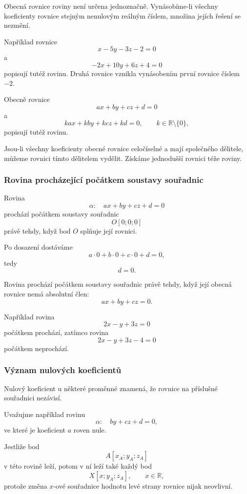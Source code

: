 Obecná rovnice roviny není určena jednoznačně. Vynásobíme-li všechny
koeficienty rovnice stejným nenulovým reálným číslem, množina jejích
řešení se nezmění.

Například rovnice
\[
    x-5y-3z-2=0
\]
a
\[
    -2x+10y+6z+4=0
\]
popisují tutéž rovinu. Druhá rovnice vznikla vynásobením první rovnice
číslem $-2$.

Obecně rovnice
\[
    ax+by+cz+d=0
\]
a
\[
    kax+kby+kcz+kd=0,
    \qquad
    k\in\mathbb{R}\setminus\{0\},
\]
popisují tutéž rovinu.

\begin{remark}
    Jsou-li všechny koeficienty obecné rovnice celočíselné a mají
    společného dělitele, můžeme rovnici tímto dělitelem vydělit.
    Získáme jednodušší rovnici téže roviny.
\end{remark}


\subsubsection{Rovina procházející počátkem soustavy souřadnic}
\label{subsubsec:Plane_through_origin}

Rovina
\[
    \alpha:\quad ax+by+cz+d=0
\]
prochází počátkem soustavy souřadnic
\[
    O[0;0;0]
\]
právě tehdy, když bod $O$ splňuje její rovnici.

Po dosazení dostáváme
\[
    a\cdot0+b\cdot0+c\cdot0+d=0,
\]
tedy
\[
    d=0.
\]

\begin{remark}
    Rovina prochází počátkem soustavy souřadnic právě tehdy, když její
    obecná rovnice nemá absolutní člen:
    \[
        ax+by+cz=0.
    \]
\end{remark}

Například rovina
\[
    2x-y+3z=0
\]
počátkem prochází, zatímco rovina
\[
    2x-y+3z-4=0
\]
počátkem neprochází.


\subsubsection{Význam nulových koeficientů}
\label{subsubsec:Zero_coefficients_general_plane}

Nulový koeficient u některé proměnné znamená, že rovnice na příslušné
souřadnici nezávisí.

Uvažujme například rovinu
\[
    \alpha:\quad by+cz+d=0,
\]
ve které je koeficient $a$ roven nule.

Jestliže bod
\[
    A[x_A;y_A;z_A]
\]
v této rovině leží, potom v ní leží také každý bod
\[
    X[x;y_A;z_A],
    \qquad
    x\in\mathbb{R},
\]
protože změna $x$-ové souřadnice hodnotu levé strany rovnice nijak
neovlivní.


